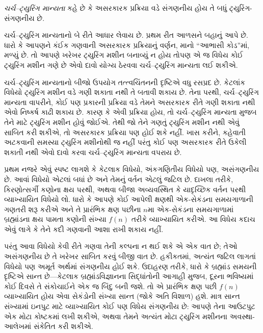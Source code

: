 \begin{defn}[ચર્ચ--ટ્યુરિંગ માન્યતા]
\emph{ચર્ચ--ટ્યુરિંગ માન્યતા} કહે છે કે અસરકારક
પ્રક્રિયા વડે સંગણનીય હોય તે બધું ટ્યુરિંગ-સંગણનીય છે.
\end{defn}

ચર્ચ--ટ્યુરિંગ માન્યતાનો બે રીતે આધાર લેવાય છે. પ્રથમ
રીત આળસને બહાનું આપે છે. ધારો કે આપણને કંઈક ગણવાની
અસરકારક પ્રક્રિયાનું વર્ણન, માનો ``આભાસી કોડ''માં,
મળ્યું છે. તો આપણે ખરેખર ટ્યુરિંગ મશીન બનાવ્યું ન
હોય તોપણ એ જ વિધેય કોઈ ટ્યુરિંગ મશીન ગણે છે એવો
દાવો યોગ્ય ઠેરવવા ચર્ચ--ટ્યુરિંગ માન્યતા લઈ શકીએ.

ચર્ચ--ટ્યુરિંગ માન્યતાનો બીજો ઉપયોગ તત્ત્વચિંતનની
દૃષ્ટિએ વધુ રસપ્રદ છે. કેટલાંક વિધેયો ટ્યુરિંગ મશીન
વડે ગણી શકાતા નથી તે બતાવી શકાય છે. તેના પરથી,
ચર્ચ--ટ્યુરિંગ માન્યતા વાપરીને, કોઈ પણ પ્રકારની પ્રક્રિયા
વડે તેમને અસરકારક રીતે ગણી શકાતા નથી એવો નિષ્કર્ષ
કાઢી શકાય છે. કારણ કે એવી પ્રક્રિયા હોય, તો
ચર્ચ--ટ્યુરિંગ માન્યતા મુજબ તેને માટે ટ્યુરિંગ મશીન
હોવું જોઈએ. તેથી જો તેને ગણતું ટ્યુરિંગ મશીન નથી
એવું સાબિત કરી શકીએ, તો અસરકારક પ્રક્રિયા પણ
હોઈ શકે નહીં. ખાસ કરીને, કહેવાતી અટકવાની સમસ્યા
ટ્યુરિંગ મશીનોથી જ નહીં પરંતુ કોઈ પણ અસરકારક રીતે
ઉકેલી શકાતી નથી એવો દાવો કરવા ચર્ચ--ટ્યુરિંગ
માન્યતા વપરાય છે.
\endgroup


\OLEndChapterHook
\endgroup


\begingroup
\makeatletter{}\makeatother

\label{guunit:OLP-0264}


\begingroup
\makeatletter{}\makeatother

\label{guunit:OLP-0265}


પ્રથમ નજરે એવું સ્પષ્ટ લાગશે કે કેટલાક વિધેયો, અંકગણિતીય
વિધેયો પણ, અસંગણનીય છે. આવાં વિધેયો એટલાં બધાં છે
અને તેમનું વર્તન એટલું
જટિલ છે. દાખલા તરીકે, કિરણોત્સર્ગી કણોના ક્ષય પરથી, અથવા
બીજા અવ્યવસ્થિત કે યાદૃચ્છિક વર્તન પરથી વ્યાખ્યાયિત વિધેયો લો.
ધારો કે આપણે કોઈ આપેલી ક્ષણથી એક-સેકંડના સમયગાળાની ગણતરી
શરૂ કરીએ અને તે પ્રારંભિક ક્ષણ પછીના $n$મા એક-સેકંડના
સમયગાળામાં બ્રહ્માંડના ક્ષય પામતા કણોની સંખ્યા $f(n)$ તરીકે
વ્યાખ્યાયિત કરીએ. આ વિધેય કદાચ એવું લાગે કે તેને કદી
ગણવાની આશા રાખી શકાય નહીં.

પરંતુ આવા વિધેયો કેવી રીતે ગણવા તેની કલ્પના ન થઈ શકે એ એક
વાત છે; તેઓ અસંગણનીય છે તે ખરેખર સાબિત કરવું બીજી વાત છે.
હકીકતમાં, અત્યંત જટિલ લાગતાં વિધેયો પણ અમૂર્ત અર્થમાં
સંગણનીય હોઈ શકે. ઉદાહરણ તરીકે, ધારો કે બ્રહ્માંડ સમયની
દૃષ્ટિએ સાન્ત છે---કેટલાક બ્રહ્માંડવિજ્ઞાનના સિદ્ધાંતોની
આગાહી મુજબ, દૂરના ભવિષ્યમાં કોઈ દિવસે તે સંકોચાઈને એક જ
બિંદુ બની જશે. તો એ પ્રારંભિક ક્ષણ પછી $f(n)$ વ્યાખ્યાયિત
હોય એવા સેકંડોની સંખ્યા સાન્ત (જોકે અતિ વિશાળ) હશે.
માત્ર સાન્ત સંખ્યામાં ઇનપુટ માટે વ્યાખ્યાયિત કોઈ પણ વિધેય
સંગણનીય છે: આપણે તેના આઉટપુટ એક મોટા કોષ્ટકમાં લખી શકીએ,
અથવા તેમને અત્યંત મોટા ટ્યુરિંગ મશીનના અવસ્થા-આલેખમાં
સંકેતિત કરી શકીએ.

